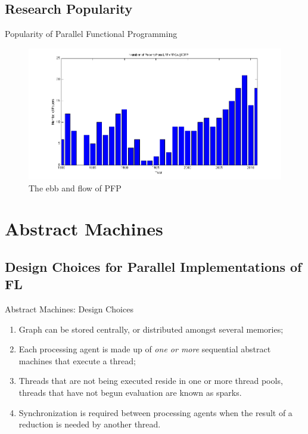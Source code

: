 \documentclass{beamer}
\begin{document}
\subsection[Research Popularity]{Research Popularity}

\begin{frame}[fragile]{Popularity of Parallel Functional Programming}{}
    \begin{figure}
    \centering
        \includegraphics[scale=.4]{figures/numPapers.png}
        \caption{The ebb and flow of PFP}
    \end{figure}

\end{frame}

\section{Abstract Machines}
\subsection[Design Choices for Parallel Implementations of Functional Languages]{Design Choices for Parallel Implementations of FL}

\begin{frame}{Abstract Machines: Design Choices \citep{clackBook}}
    \begin{enumerate}
        \item Graph can be stored centrally, or distributed amongst several memories;
        \item Each processing agent is made up of \emph{one or more} sequential abstract
                machines that execute a thread;
        \item Threads that are not being executed reside in one or more thread pools, threads
                that have not begun evaluation are known as sparks.
        \item Synchronization is required between processing agents when the result of a reduction
                is needed by another thread. 
    \end{enumerate}
\end{frame}
\end{document}
